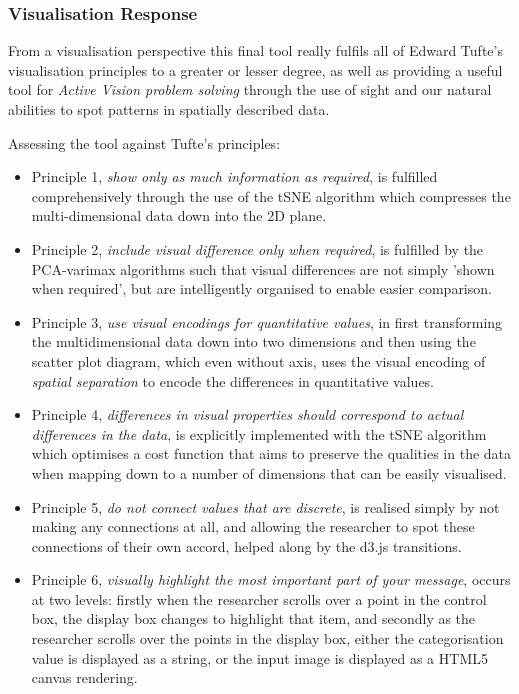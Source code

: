 \documentclass[a4paper,11pt,titlepage]{article}
\begin{document}
	\subsubsection{Visualisation Response}
	From a visualisation perspective this final tool really fulfils all of Edward Tufte's visualisation principles to a greater or lesser degree, as well as providing a useful tool for \textit{Active Vision problem solving} through the use of sight and our natural abilities to spot patterns in spatially described data.
	\par 
	Assessing the tool against Tufte's principles:
	\begin{itemize}
		\item Principle 1, \textit{show only as much information as required}, is fulfilled comprehensively through the use of the tSNE algorithm which compresses the multi-dimensional data down into the 2D plane.
		\item Principle 2, \textit{include visual difference only when required}, is fulfilled by the PCA-varimax algorithms such that visual differences are not simply 'shown when required', but are intelligently organised to enable easier comparison.
		\item Principle 3, \textit{use visual encodings for quantitative values}, in first transforming the multidimensional data down into two dimensions and then using the scatter plot diagram, which even without axis, uses the visual encoding of \textit{spatial separation} to encode the differences in quantitative values.
		\item Principle 4, \textit{differences in visual properties should correspond to actual differences in the data}, is explicitly implemented with the tSNE algorithm which optimises a cost function that aims to preserve the qualities in the data when mapping down to a number of dimensions that can be easily visualised. 
		\item Principle 5, \textit{do not connect values that are discrete}, is realised simply by not making any connections at all, and allowing the researcher to spot these connections of their own accord, helped along by the d3.js transitions.
		\item Principle 6, \textit{visually highlight the most important part of your message}, occurs at two levels: firstly when the researcher scrolls over a point in the control box, the display box changes to highlight that item, and secondly as the researcher scrolls over the points in the display box, either the categorisation value is displayed as a string, or the input image is displayed as a HTML5 canvas rendering. 

\end{itemize}
\end{document}
